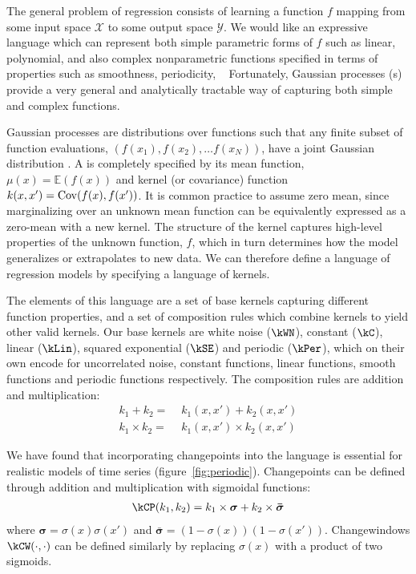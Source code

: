The general problem of regression consists of learning a function $f$
mapping from some input space $\mathcal{X}$ to some output space
$\mathcal{Y}$. We would like an expressive language which can
represent both simple parametric forms of $f$ such as linear, polynomial, \etc and also complex nonparametric functions
specified in terms of properties such as smoothness, periodicity, \etc~
Fortunately, Gaussian processes (\gp{}s) provide a very general
and analytically tractable way of capturing both simple and complex
functions. 

Gaussian processes are distributions over functions such that any
finite subset of function evaluations, $(f(x_1), f(x_2), \ldots
f(x_N))$, have a joint Gaussian distribution
\citep{rasmussen38gaussian}. A \gp{} is completely specified by its
mean function, $\mu(x)=\mathbb{E}(f(x))$ and kernel (or covariance) function
$k(x,x') = \operatorname{Cov}(f(x),f(x'))$.
It is common practice to assume zero mean,
since marginalizing over an unknown mean function can be equivalently
expressed as a zero-mean \gp{} with a new kernel. The structure of the
kernel captures high-level properties of the unknown function, $f$,
which in turn determines how the model generalizes or extrapolates to
new data.  We can therefore define a language of regression models by
specifying a language of kernels.

The elements of this language are a set of  base
kernels capturing different function properties, and a set of
composition rules which combine kernels to yield other valid kernels.
Our base kernels are white noise ($\kWN$), constant ($\kC$), linear ($\kLin$), squared exponential ($\kSE$) and periodic ($\kPer$), which on their own encode for uncorrelated noise, constant functions, linear functions, smooth functions and periodic functions respectively.
The composition rules are addition and multiplication:
\begin{align}
k_1 + k_2 =      & \,\, k_1(x,x') + k_2(x,x') \\
k_1 \times k_2 = & \,\, k_1(x,x') \times k_2(x,x')
\end{align}


We have found that incorporating changepoints into the language is essential for
realistic models of time series (\eg figure~\ref{fig:periodic}). 
Changepoints can be defined through addition and multiplication with sigmoidal functions:
\begin{align}
\kCP(\kernel_1, \kernel_2) = \kernel_1 \times \boldsymbol\sigma + \kernel_2 \times \boldsymbol{\bar\sigma}
\label{eq:cp}
\end{align}
where $\boldsymbol\sigma = \sigma(x)\sigma(x')$ and $\boldsymbol{\bar\sigma} = (1-\sigma(x))(1-\sigma(x'))$.
Changewindows $\kCW(\cdot,\cdot)$ can be defined similarly by replacing $\sigma(x)$ with a product of two sigmoids.

